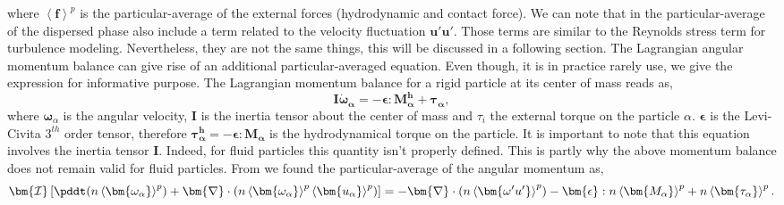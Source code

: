 where $\left<\bm{f}\right>^p$ is the particular-average of the external forces (hydrodynamic and contact force).
We can note that in the particular-average of the dispersed phase also include a term related to the velocity fluctuation $\bm{u'u'}$. 
Those terms are similar to the Reynolds stress term for turbulence modeling.
Nevertheless, they are not the same things, this will be discussed in a following section. 
The Lagrangian angular momentum balance can give rise of an additional particular-averaged equation. 
Even though, it is in practice rarely use, we give the expression for informative purpose.
The Lagrangian momentum balance for a rigid particle at its center of mass reads as,
\begin{equation}
    \mathcal{\bm{I}}\bm{\dot{\omega}_\alpha} = - \bm{\epsilon} : \bm{M^{h}_\alpha} + \bm{\tau_\alpha},
    \label{eq:newtion2law2}
\end{equation}
where $\bm{\omega}_\alpha$ is the angular velocity, $\mathcal{\bm{I}}$ is the inertia tensor about the center of mass and $\tau_i$ the external torque on the particle $\alpha$. 
$\bm{\epsilon}$ is the Levi-Civita $3^{th}$ order tensor, therefore $\bm{\tau^h_\alpha} = - \bm{\epsilon} : \bm{M_\alpha}$ is the hydrodynamical torque on the particle.  
It is important to note that this equation involves the inertia tensor $\mathcal{\bm{I}}$.
Indeed, for fluid particles this quantity isn't properly defined.
This is partly why the above momentum balance does not remain valid for fluid particles.
From \citet{jackson1997locally} we found the particular-average of the angular momentum as,
\begin{equation}
    \bm{\mathcal{I}} \left[\pddt(n\left<\bm{\omega_\alpha}\right>^p)
    +\bm{\nabla}\cdot(n\left<\bm{\omega_\alpha }\right>^p\left<\bm{u_\alpha}\right>^p)\right] 
    = -\bm{\nabla}\cdot(n\left<\bm{\omega'u'}\right>^p) 
    - \bm{\epsilon} : n\left<\bm{M_\alpha}\right>^p 
    + n\left<\bm{\tau_\alpha}\right>^p.
    \label{eq:Iavg}
\end{equation}


